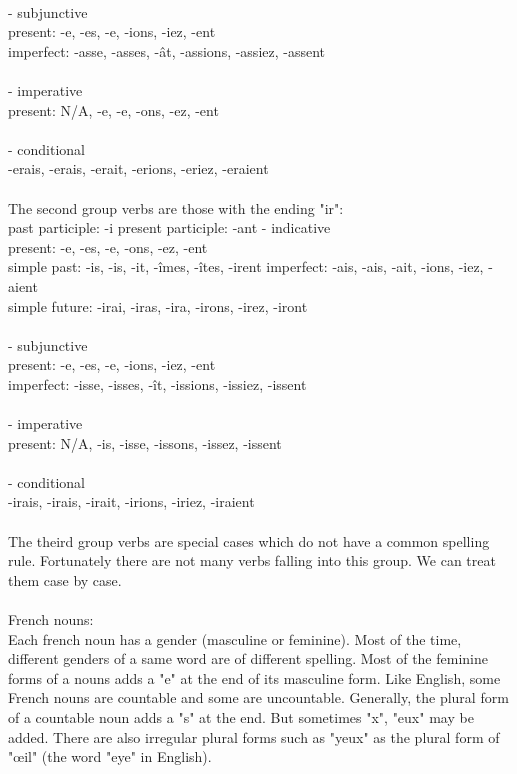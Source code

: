 \documentclass[11pt,letterpaper]{article}
\begin{document}
\\
\indent - subjunctive\\
\indent\indent present: -e, -es, -e, -ions, -iez, -ent\\
\indent\indent imperfect: -asse, -asses, -\^at, -assions, -assiez, -assent\\
\\
\indent - imperative\\
\indent\indent present: N/A, -e, -e, -ons, -ez, -ent\\
\\
\indent - conditional\\
\indent\indent -erais, -erais, -erait, -erions, -eriez, -eraient\\
\\
\indent The second group verbs are those with the ending "ir":\\
\indent past participle: -i
\indent present participle: -ant
\indent - indicative\\
\indent\indent present: -e, -es, -e, -ons, -ez, -ent\\
\indent\indent simple past: -is, -is, -it, -\^imes, -\^ites, -irent
\indent\indent imperfect: -ais, -ais, -ait, -ions, -iez, -aient\\
\indent\indent simple future: -irai, -iras, -ira, -irons, -irez, -iront\\
\\
\indent - subjunctive\\
\indent\indent present: -e, -es, -e, -ions, -iez, -ent\\
\indent\indent imperfect: -isse, -isses, -ît, -issions, -issiez, -issent\\
\\
\indent - imperative\\
\indent\indent present: N/A, -is, -isse, -issons, -issez, -issent\\
\\
\indent - conditional\\
\indent\indent -irais, -irais, -irait, -irions, -iriez, -iraient\\
\\
\indent The theird group verbs are special cases which do not have a common spelling rule. Fortunately there are not many verbs falling into this group. We can treat them case by case.\\
\\
French nouns:\\
Each french noun has a gender (masculine or feminine). Most of the time, different genders of a same word are of different spelling. Most of the feminine forms of a nouns adds a "e" at the end of its masculine form. Like English, some French nouns are countable and some are uncountable. Generally, the plural form of a countable noun adds a "s" at the end. But sometimes "x", "eux" may be added. There are also irregular plural forms such as "yeux" as the plural form of "\oe il" (the word "eye" in English).\\
\end{document}
